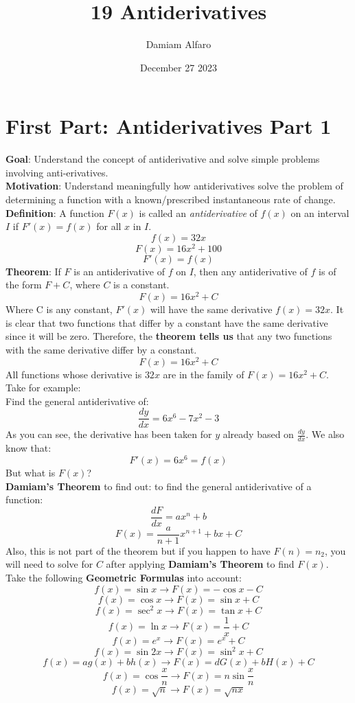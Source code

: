 \documentclass[12pt, letterpaper]{article}
\title{19 Antiderivatives}
\author{Damiam Alfaro}
\date{December 27 2023}
\begin{document}
\maketitle

\section{First Part: Antiderivatives Part 1}
\textbf{Goal}: Understand the concept of antiderivative and solve simple problems involving anti-erivatives.\\
\newline
\textbf{Motivation}: Understand meaningfully how antiderivatives solve the problem of determining a function with a known/prescribed instantaneous rate of change.\\
\newline
\textbf{Definition}: A function \(F(x)\) is called an \textit{antiderivative} of \(f(x)\) on an interval \(I\) if \(F'(x)=f(x)\) for all \(x\) in \(I\).
\[f(x)=32x\]
\[F(x)=16x^2+100\]
\[F'(x)=f(x)\]
\textbf{Theorem}: If \(F\) is an antiderivative of \(f\) on \(I\), then any antiderivative of \(f\) is of the form \(F+C\), where \(C\) is a constant.
\[F(x)=16x^2+C\]
Where C is any constant, \(F'(x)\) will have the same derivative \(f(x)=32x\). It is clear that two functions that differ by a constant have the same derivative since it will be zero. Therefore, the \textbf{theorem tells us} that any two functions with the same derivative differ by a constant.
\[F(x)=16x^2+C\]
All functions whose derivative is \(32x\) are in the family of \(F(x)=16x^2+C\). Take for example:\\
\newline
Find the general antiderivative of:
\[\frac{dy}{dx}=6x^6-7x^2-3\]
As you can see, the derivative has been taken for \(y\) already based on \(\frac{dy}{dx}\). We also know that:
\[F'(x)=6x^6 = f(x)\]
But what is \(F(x)\)?\\
\newline
\textbf{Damiam's Theorem} to find out: to find the general antiderivative of a function:
\[\frac{dF}{dx}=ax^{n}+b\]
\[F(x)=\frac{a}{n+1}x^{n+1}+bx+ C\]
Also, this is not part of the theorem but if you happen to have \(F(n)=n_2\), you will need to solve for \(C\) after applying \textbf{Damiam's Theorem} to find \(F(x)\).\\
\newline
Take the following \textbf{Geometric Formulas} into account:
\[f(x)=\sin{x} \to F(x) = -\cos{x}-C\]
\[f(x)=\cos{x} \to F(x)=\sin{x}+C\]
\[f(x)=\sec^2{x} \to F(x)=\tan{x}+C\]
\[f(x)=\ln{x} \to F(x)=\frac{1}{x}+C\]
\[f(x)=e^x \to F(x)=e^x+C\]
\[f(x)=\sin{2x} \to F(x)=\sin^2{x}+C\]
\[f(x)=ag(x)+bh(x) \to F(x) = dG(x)+bH(x)+C\]
\[f(x)=\cos{\frac{x}{n}} \to F(x)=n\sin{\frac{x}{n}} \]
\[f(x)=\sqrt{n} \to F(x)=\sqrt{nx}\]
\end{document}
